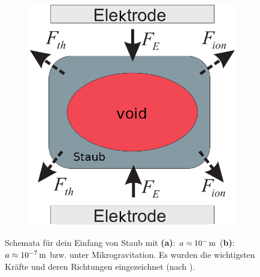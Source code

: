 \documentclass[numbers=noenddot,a4paper]{scrartcl}
\newcommand{\tenpo}[1]{ 10^{#1}}
\newcommand{\ix}[1]{_\text{#1}}
\newcommand{\tilt}[1]{\textit{#1}}
\newcommand{\fett}[1]{\textbf{#1}}
\begin{document}
\begin{figure}
\begin{subfigure}[b]{0.45\textwidth}
						\includegraphics[width=\textwidth,height=\textwidth]{figs/directionsofforcesandtrappingmelzerrechts.png}
						\caption{}
						\label{img:rechtsdirection}
					\end{subfigure}
					\caption{Schemata für dein Einfang von Staub mit \fett{(a)}: $a\approx\unit[\tenpo{-}]{m}$ (\fett{b)}: $a\approx\unit[\tenpo{-7}]{m}$ bzw. unter Mikrogravitation. Es wurden die wichtigsten Kräfte und deren Richtungen eingezeichnet (nach \cite{Melzer12}).}
					\label{img:kräfterichtungen}
				\end{figure}

\end{document}
